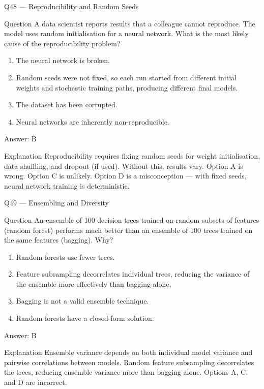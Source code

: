 \documentclass[aspectratio=169,8pt]{beamer}
\begin{document}
	\begin{frame}{Q48 --- Reproducibility and Random Seeds}
		\begin{block}{Question}
			A data scientist reports results that a colleague cannot reproduce. The model uses random initialisation for a neural network. What is the most likely cause of the reproducibility problem?
		\end{block}
		\begin{enumerate}
			\item The neural network is broken.
			\item Random seeds were not fixed, so each run started from different initial weights and stochastic training paths, producing different final models.
			\item The dataset has been corrupted.
			\item Neural networks are inherently non-reproducible.
		\end{enumerate}
		\begin{exampleblock}{Answer: B}\end{exampleblock}
		\begin{block}{Explanation}
			Reproducibility requires fixing random seeds for weight initialisation, data shuffling, and dropout (if used). Without this, results vary. Option A is wrong. Option C is unlikely. Option D is a misconception --- with fixed seeds, neural network training is deterministic.
		\end{block}
	\end{frame}
	
	\begin{frame}{Q49 --- Ensembling and Diversity}
		\begin{block}{Question}
			An ensemble of 100 decision trees trained on random subsets of features (random forest) performs much better than an ensemble of 100 trees trained on the same features (bagging). Why?
		\end{block}
		\begin{enumerate}
			\item Random forests use fewer trees.
			\item Feature subsampling decorrelates individual trees, reducing the variance of the ensemble more effectively than bagging alone.
			\item Bagging is not a valid ensemble technique.
			\item Random forests have a closed-form solution.
		\end{enumerate}
		\begin{exampleblock}{Answer: B}\end{exampleblock}
		\begin{block}{Explanation}
			Ensemble variance depends on both individual model variance and pairwise correlations between models. Random feature subsampling decorrelates the trees, reducing ensemble variance more than bagging alone. Options A, C, and D are incorrect.
		\end{block}
	\end{frame}
	
\end{document}
